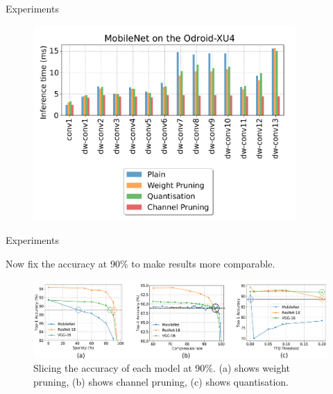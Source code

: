 \documentclass[xcolor=dvipsnames]{beamer}
\begin{document}
\begin{frame}{Experiments}
    
    \begin{figure}
        \centering
        \includegraphics[width=10cm]{images/mobilenet-odroid.pdf}
    \end{figure}
    
\end{frame}


\begin{frame}{Experiments}
    
    Now fix the accuracy at 90\% to make results more comparable.
    
    \begin{figure}
        \centering
        \includegraphics[width=\linewidth]{images/accuracy.pdf}
        \caption{Slicing the accuracy of each model at 90\%. (a) shows weight pruning, (b) shows channel pruning, (c) shows quantisation.}
    \end{figure}
    
\end{frame}
\end{document}
